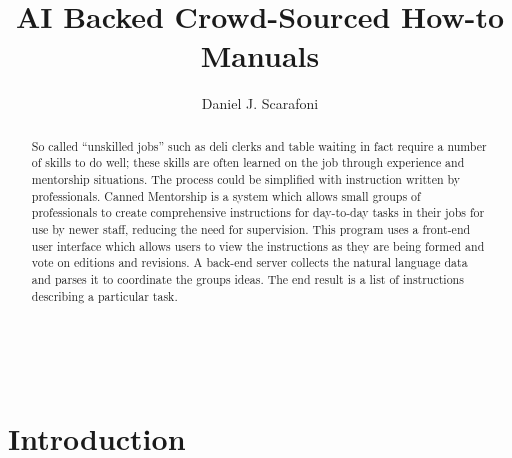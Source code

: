 \documentclass[11pt,leqno]{report}
\begin{document}
\sloppy
\title{AI Backed Crowd-Sourced How-to Manuals}
\author{Daniel J. Scarafoni}
\maketitle


\thispagestyle{empty}
\newenvironment{dedication}
{\cleardoublepage \thispagestyle{empty} \vspace*{\stretch{1}}
  \begin{center} \em}
  {\end{center} \vspace*{\stretch{3}} }


\begin{abstract}
	So called “unskilled jobs” such as deli clerks and table waiting in fact require a number of skills to do well; these skills are often learned on the job through experience and mentorship situations. The process could be simplified with instruction written by professionals. Canned Mentorship is a system which allows small groups of professionals to create comprehensive instructions for day-to-day tasks in their jobs for use by newer staff, reducing the need for supervision. This program uses a front-end user interface which allows users to view the instructions as they are being formed and vote on editions and revisions. A back-end server collects the natural language data and parses it to coordinate the groups ideas. The end result is a list of instructions describing a particular task.
\end{abstract}

\tableofcontents
\pagebreak\

\begin{comment}
introduction
	-want to address effective combinations of ai and humans
	-crowd sourcing has been used to answer questions
	-crowd sourcing has been used to annotate instructions
	-crowd sourcing instructions has been lacng
	-try to improve this with canned mentorship
		-named for its original application
background
	-crowd source question answering
		-toolscape
		-legion
		-scribe
	-crowd source question answering
		-turkomatic
		-failed b/c stuff
methodology
	-system description
		-front end
			-ui and workflow
		-backend
			-ai
			-algorithms used
	-experiment setup
\end{comment}

\chapter{Introduction}

\end{document}

